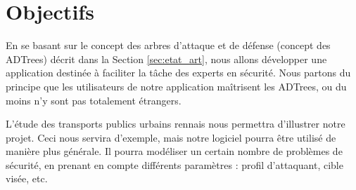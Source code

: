 \section{Objectifs}
	\label{sec:objectifs}

	En se basant sur le concept des arbres d’attaque et de défense (concept des ADTrees) décrit dans la Section \ref{sec:etat_art}, nous allons développer une application destinée à faciliter la tâche des experts en sécurité. Nous partons du principe que les utilisateurs de notre application maîtrisent les ADTrees, ou du moins n’y sont pas totalement étrangers.

	L’étude des transports publics urbains rennais nous permettra d’illustrer notre projet. Ceci nous servira d’exemple, mais notre logiciel pourra être utilisé de manière plus générale. Il pourra modéliser un certain nombre de problèmes de sécurité, en prenant en compte différents paramètres : profil d’attaquant, cible visée, etc.
